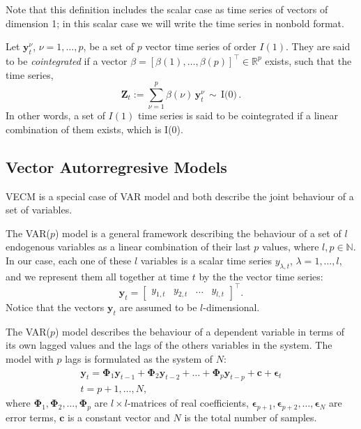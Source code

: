\documentclass[twocolumn]{svjour3}          %
\begin{document}
Note that this definition includes the scalar case as time series of
vectors of dimension 1; in this scalar case we will write the time series in
nonbold format.

Let $\mathbf{y}_t^\nu$, $\nu=1,\dots,p$, be a set of $p$ vector time series of
order $I(1)$.  They are said to be {\em cointegrated\/} if a vector
$\beta=[\beta(1),\dots,\beta(p)]^\top \in \mathbb{R}^p$ exists, such that the
time series,
\begin{equation}
\mathbf{Z}_t:= 
\sum_{\nu=1}^p \beta(\nu)\,\mathbf{y}_t^\nu\,\sim\,\text{I(0)}\,.
\end{equation}
In other words, a set of $I(1)$ time series is said to be cointegrated if a
linear combination of them exists, which is I(0).


\subsection{Vector Autorregresive Models}\label{sec:varvec}

VECM is a special case of VAR model and both describe the joint behaviour
of a set of variables.

The VAR($p$) model is a general framework describing the behaviour of a
set of $l$ endogenous variables as a linear combination of their last $p$
values, where $l,p\in\mathbb{N}$. 
In our case, each one of these $l$ variables is a scalar time series
$y_{\lambda,t}$, $\lambda=1,\dots,l$, and we represent them all together
at time $t$ by the the vector time series:
\begin{equation}
\label{eq:variables}
\mathbf{y}_t = 
\begin{bmatrix} y_{1,t} & y_{2,t} & \dots & y_{l,t} \end{bmatrix}^\top.
\end{equation}
\noindent
Notice that the vectors $\mathbf{y}_t$ are assumed to be $l$-dimensional.

The VAR($p$) model describes the behaviour of a dependent variable in terms of
its own lagged values and the lags of the others variables in the system. The
model with $p$ lags is formulated as the system of $N$:
\begin{align}
\label{eq:var}
\mathbf{y}_t 
= \boldsymbol{\Phi}_1 \mathbf{y}_{t-1} +
  \boldsymbol{\Phi}_2 \mathbf{y}_{t-2} + \dots +
  \boldsymbol{\Phi}_p\mathbf{y}_{t-p} +
  \mathbf{c} + \boldsymbol{\epsilon}_t \nonumber \\
t=p+1,\dots,N,
\end{align}
\noindent where 
$\boldsymbol{\Phi}_1, \boldsymbol{\Phi}_2,\dots,\boldsymbol{\Phi}_p$
are $l\times l$-matrices of real coefficients,
$\boldsymbol{\epsilon}_{p+1},
 \boldsymbol{\epsilon}_{p+2}, \dots, \boldsymbol{\epsilon}_N$ 
are error terms, $\mathbf{c}$ is a constant vector and $N$ is the total
number of samples.
\end{document}
